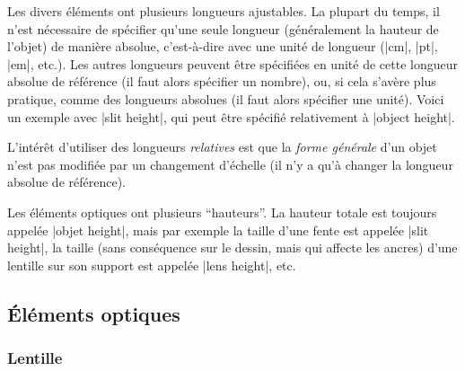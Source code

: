 \documentclass[a4paper]{ltxdoc}
\begin{document}
Les divers éléments ont plusieurs longueurs ajustables. La plupart du temps, il n'est nécessaire de spécifier qu'une seule longueur (généralement la hauteur de l'objet) de manière absolue, c'est-à-dire avec une unité de longueur (|cm|, |pt|, |em|, etc.). Les autres longueurs peuvent être spécifiées en unité de cette longueur absolue de référence (il faut alors spécifier un nombre), ou, si cela s'avère plus pratique, comme des longueurs absolues (il faut alors spécifier une unité). Voici un exemple avec |slit height|, qui peut être spécifié relativement à |object height|.

\begin{codeexample}[width=6cm]
\end{codeexample}

L'intérêt d'utiliser des longueurs \emph{relatives} est que la \emph{forme générale} d'un objet n'est pas modifiée par un changement d'échelle (il n'y a qu'à changer la longueur absolue de référence).

Les éléments optiques ont plusieurs \enquote{hauteurs}. La hauteur totale est toujours appelée |objet height|, mais par exemple la taille d'une fente est appelée |slit height|, la taille (sans conséquence sur le dessin, mais qui affecte les ancres) d'une lentille sur son support est appelée |lens height|, etc. 



\subsection{Éléments optiques}

\subsubsection{Lentille}
\end{document}
